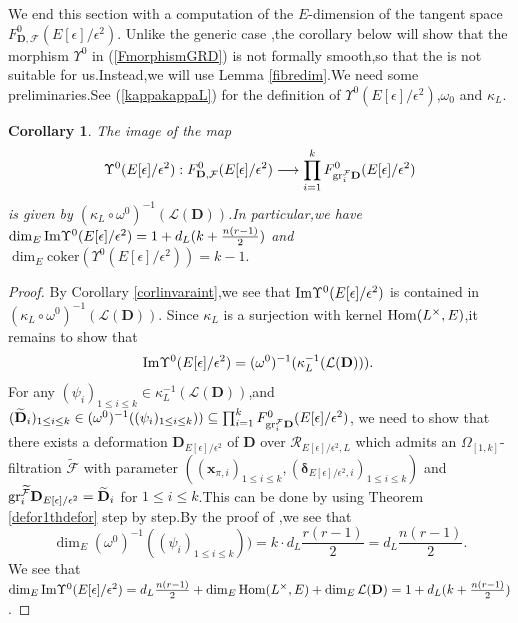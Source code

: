 \documentclass[SecEq,CM,GP]{degruyter-crelle} %
\theoremstyle{plain}
\newtheorem{cor}[thm]{Corollary}
\newcommand{\Dpik}{{\mathbf{D}}}
\newcommand{\gr}{{\rm gr}}
\newcommand{\homo}{{\rm Hom}}
\newcommand{\im}{{\rm Im}}
\newcommand{\omepik}{\Omega_{[1,k]}}
\newcommand{\bx}{{\mathbf{x}}}
\newcommand{\cR}{\mathcal R}
\newcommand{\cF}{\mathcal F}
\newcommand{\sL}{\mathcal L}
\begin{document}
We end this section with a computation of the $E$-dimension of the tangent space $F_{\Dpik,\cF}^0(E[\epsilon]/\epsilon^2)$. Unlike the generic case \cite[Proposition 4.1.16]{Ding2021},\;the corollary below will show that the morphism $\Upsilon^0$ in (\ref{FmorphismGRD}) is not formally smooth,\;so that the \cite[Proposition 4.1.17]{Ding2021} is not suitable for us.\;Instead,\;we will use Lemma \ref{fibredim}.\;We need some preliminaries.\;See (\ref{kappakappaL}) for the definition of $\Upsilon^0(E[\epsilon]/\epsilon^2)$,\;$\omega_0$ and $\kappa_L$.\;
\begin{cor}\label{corlinvaraint1}The image of the map $$\Upsilon^0(E[\epsilon]/\epsilon^2):F_{\Dpik,\cF}^0(E[\epsilon]/\epsilon^2)\longrightarrow \prod_{i=1}^kF_{\gr_i^{\cF}\Dpik}^0(E[\epsilon]/\epsilon^2)$$ is given by $(\kappa_L\circ\omega^0)^{-1}(\sL(\Dpik))$.\;In particular,\;we have
$\dim_E\im\Upsilon^0(E[\epsilon]/\epsilon^2)=1+d_L(k+\frac{n(r-1)}{2})$ and  $\dim_E\mathrm{coker}(\Upsilon^0(E[\epsilon]/\epsilon^2))=k-1.$
\end{cor}
\begin{proof}By Corollary \ref{corlinvaraint},\;we see that $\im\Upsilon^0(E[\epsilon]/\epsilon^2)$ is contained in $(\kappa_L\circ\omega^0)^{-1}(\sL(\Dpik))$. Since $\kappa_L$ is a surjection with kernel $\homo(L^\times,E)$,\;it remains to show that $$\im\Upsilon^0(E[\epsilon]/\epsilon^2)=(\omega^0)^{-1}(\kappa_L^{-1}(\sL(\Dpik))).\;$$For any $(\psi_i)_{1\leq i\leq k}\in \kappa_L^{-1}(\sL(\Dpik))$,\;and $(\widetilde\Dpik_i)_{1\leq i\leq k}\in(\omega^0)^{-1}((\psi_i)_{1\leq i\leq k}))\subseteq \prod_{i=1}^kF_{\gr_i^{\cF}\Dpik}^0(E[\epsilon]/\epsilon^2)$, we need to show that there exists a deformation $\Dpik_{E[\epsilon]/\epsilon^2}$ of $\Dpik$ over $\cR_{E[\epsilon]/\epsilon^2,L}$ which admits  an $\omepik$-filtration $\widetilde{\cF}$ with parameter $((\bx_{\pi,i})_{1\leq i\leq k},(\bm{\delta}_{E[\epsilon]/\epsilon^2,i})_{1\leq i\leq k})$ and  $\gr^{\widetilde{\cF}}_{i}\Dpik_{E[\epsilon]/\epsilon^2}=\widetilde\Dpik_i$ for $1\leq i\leq k$.\;This can be done by using Theorem \ref{defor1thdefor} step by step.\;By the proof of \cite[Proposition 4.1.4]{Ding2021},\;we see that 
\[\dim_E(\omega^0)^{-1}((\psi_i)_{1\leq i\leq k}))=k\cdot d_L\frac{r(r-1)}{2}= d_L\frac{n(r-1)}{2}.\]
We see that $\dim_E\im\Upsilon^0(E[\epsilon]/\epsilon^2)= d_L\frac{n(r-1)}{2}+\dim_E\homo(L^\times,E)+\dim_E\sL(\Dpik)=1+d_L(k+\frac{n(r-1)}{2})$.
\end{proof}
\end{document}
